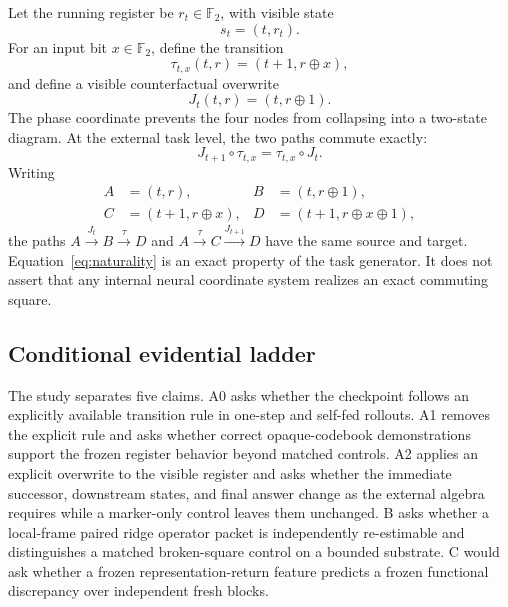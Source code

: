 \documentclass[10pt,a4paper]{article}
\begin{document}
Let the running register be $r_t\in\mathbb F_2$, with visible state
\begin{equation}
  s_t=(t,r_t).
\end{equation}
For an input bit $x\in\mathbb F_2$, define the transition
\begin{equation}
  \tau_{t,x}(t,r)=(t+1,r\oplus x),
\end{equation}
and define a visible counterfactual overwrite
\begin{equation}
  J_t(t,r)=(t,r\oplus 1).
\end{equation}
The phase coordinate prevents the four nodes from collapsing into a two-state diagram. At the external task level, the two paths commute exactly:
\begin{equation}
  \boxed{J_{t+1}\circ\tau_{t,x}=\tau_{t,x}\circ J_t.}
  \label{eq:naturality}
\end{equation}
Writing
\begin{align}
  A&=(t,r), & B&=(t,r\oplus1),\\
  C&=(t+1,r\oplus x), & D&=(t+1,r\oplus x\oplus1),
\end{align}
the paths $A\xrightarrow{J_t}B\xrightarrow{\tau}D$ and $A\xrightarrow{\tau}C\xrightarrow{J_{t+1}}D$ have the same source and target. Equation~\eqref{eq:naturality} is an exact property of the task generator. It does not assert that any internal neural coordinate system realizes an exact commuting square.

\subsection{Conditional evidential ladder}

The study separates five claims. A0 asks whether the checkpoint follows an explicitly available transition rule in one-step and self-fed rollouts. A1 removes the explicit rule and asks whether correct opaque-codebook demonstrations support the frozen register behavior beyond matched controls. A2 applies an explicit overwrite to the visible register and asks whether the immediate successor, downstream states, and final answer change as the external algebra requires while a marker-only control leaves them unchanged. B asks whether a local-frame paired ridge operator packet is independently re-estimable and distinguishes a matched broken-square control on a bounded substrate. C would ask whether a frozen representation-return feature predicts a frozen functional discrepancy over independent fresh blocks.
\end{document}
